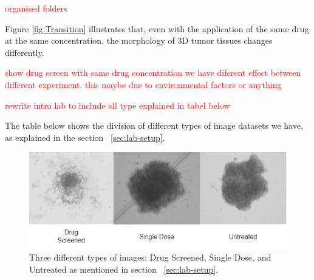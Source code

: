 \textcolor{red}{organised folders}


Figure \ref{fig:Transition} illustrates that, even with the application of the same drug at the same concentration, the morphology of 3D tumor tissues changes differently.

\textcolor{red}{ show drug screen with same drug concentration we have diferent effect between different experiment. this maybe due to environmental 
factors or anything}


\textcolor{red}{rewrite intro lab to include all type explained in tabel below}

The table below shows the division of different types of image datasets we have, as  explained in the section ~\ref{sec:lab-setup}.
\begin{table}[ht!]
  \centering
  \caption{Dataset Class Overview}
  \label{tab:dataset}
\end{table}




\begin{figure}[H]
  \centering
  \includegraphics[scale=0.6]{figures/originals.png} 
  \caption{Three different types of images: Drug Screened, Single Dose, and Untreated as mentioned in section ~\ref{sec:lab-setup}.}
  \label{fig:originals}
\end{figure}


